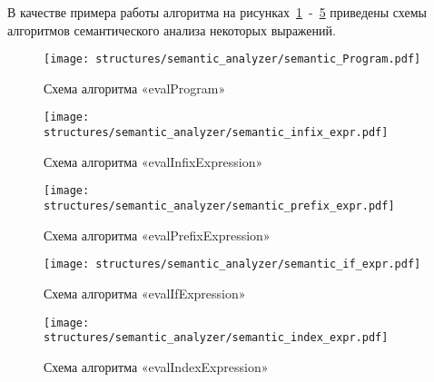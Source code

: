 В качестве примера работы алгоритма на рисунках~\ref{f:evalProgram}~-~\ref{f:semantic_index_expr} приведены схемы алгоритмов семантического анализа некоторых выражений.


\begin{figure}[!htp]
	\centering
	\texttt{[image: structures/semantic\_analyzer/semantic\_Program.pdf]}
	\caption{Схема алгоритма «evalProgram»}
	\label{f:evalProgram}
\end{figure}

\clearpage

\begin{figure}[!htp]
	\centering
	\texttt{[image: structures/semantic\_analyzer/semantic\_infix\_expr.pdf]}
	\caption{Схема алгоритма «evalInfixExpression»}
	\label{f:semantic_infix_expr}
\end{figure}

\clearpage

\begin{figure}[!htp]
	\centering
	\texttt{[image: structures/semantic\_analyzer/semantic\_prefix\_expr.pdf]}
	\caption{Схема алгоритма «evalPrefixExpression»}
	\label{f:semantic_prefix_expr}
\end{figure}

\clearpage

\begin{figure}[!htp]
	\centering
	\texttt{[image: structures/semantic\_analyzer/semantic\_if\_expr.pdf]}
	\caption{Схема алгоритма «evalIfExpression»}
	\label{f:semantic_if_expr}
\end{figure}

\clearpage

\begin{figure}[!htp]
	\centering
	\texttt{[image: structures/semantic\_analyzer/semantic\_index\_expr.pdf]}
	\caption{Схема алгоритма «evalIndexExpression»}
	\label{f:semantic_index_expr}
\end{figure}